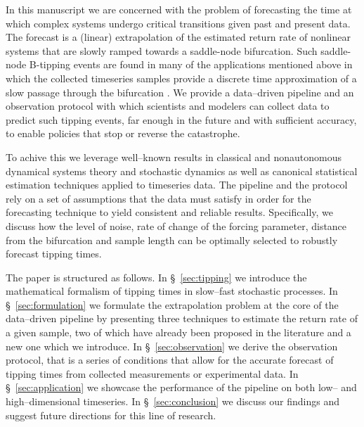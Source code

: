 \documentclass[openacc]{rsproca_new}
\begin{document}
In this manuscript we are concerned with the problem of forecasting the time at which complex systems undergo critical transitions given past and present data.
The forecast is a (linear) extrapolation of the estimated return rate of nonlinear systems that are slowly ramped towards a saddle-node bifurcation.
Such saddle-node B-tipping events are found in many of the applications mentioned above in which the collected timeseries samples provide a discrete time approximation of a slow passage through the bifurcation \cite{Tsai2025}.
We provide a data--driven pipeline and an observation protocol with which scientists and modelers can collect data to predict such tipping events, far enough in the future and with sufficient accuracy, to enable policies that stop or reverse the catastrophe.

To achive this we leverage well--known results in classical and nonautonomous dynamical systems theory and stochastic dynamics as well as canonical statistical estimation techniques applied to timeseries data.
The pipeline and the protocol rely on a set of assumptions that the data must satisfy in order for the forecasting technique to yield consistent and reliable results.
Specifically, we discuss how the level of noise, rate of change of the forcing parameter, distance from the bifurcation and sample length can be optimally selected to robustly forecast tipping times.

The paper is structured as follows.
In \S~\ref{sec:tipping} we introduce the mathematical formalism of tipping times in slow--fast stochastic processes.
In \S~\ref{sec:formulation} we formulate the extrapolation problem at the core of the data--driven pipeline by presenting three techniques to estimate the return rate of a given sample, two of which have already been proposed in the literature and a new one which we introduce.
In \S~\ref{sec:observation} we derive the observation protocol, that is a series of conditions that allow for the accurate forecast of tipping times from collected measurements or experimental data.
In \S~\ref{sec:application} we showcase the performance of the pipeline on both low-- and high--dimensional timeseries.
In \S~\ref{sec:conclusion} we discuss our findings and suggest future directions for this line of research.
\end{document}
